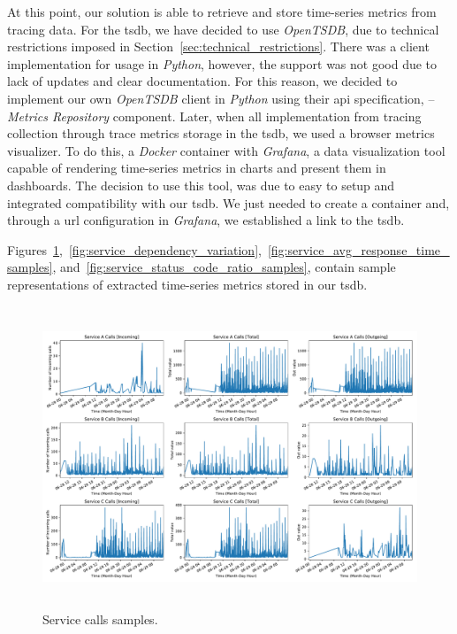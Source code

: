 At this point, our solution is able to retrieve and store time-series metrics from tracing data. For the \gls{tsdb}, we have decided to use \emph{OpenTSDB}, due to technical restrictions imposed in Section~\ref{sec:technical_restrictions}. There was a client implementation for usage in \emph{Python}, however, the support was not good due to lack of updates and clear documentation. For this reason, we decided to implement our own \emph{OpenTSDB} client in \emph{Python} using their \gls{api} specification, -- \emph{Metrics Repository} component. Later, when all implementation from tracing collection through trace metrics storage in the \gls{tsdb}, we used a browser metrics visualizer. To do this, a \emph{Docker} container with \emph{Grafana}, a data visualization tool capable of rendering time-series metrics in charts and present them in dashboards. The decision to use this tool, was due to easy to setup and integrated compatibility with our \gls{tsdb}. We just needed to create a container and, through a url configuration in \emph{Grafana}, we established a link to the \gls{tsdb}.

Figures~\ref{fig:service_calls_samples},~\ref{fig:service_dependency_variation},~\ref{fig:service_avg_response_time_samples}, and~\ref{fig:service_status_code_ratio_samples}, contain sample representations of extracted time-series metrics stored in our \gls{tsdb}.

\begin{figure}[H]
    \centering
    \includegraphics[width=15cm, height=9cm]{images/service_calls.pdf}
    \caption{Service calls samples.}
    \label{fig:service_calls_samples}
\end{figure}

